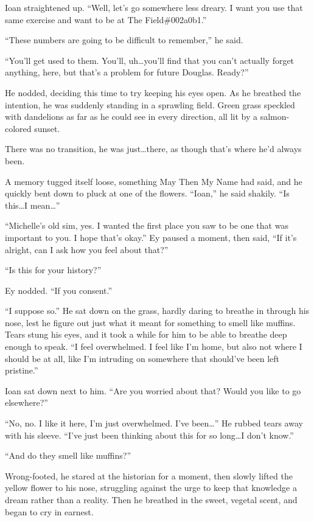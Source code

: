 Ioan straightened up. ``Well, let's go somewhere less dreary. I want you use that same exercise and want to be at The Field\#002a0b1.''

``These numbers are going to be difficult to remember,'' he said.

``You'll get used to them. You'll, uh\ldots you'll find that you can't actually forget anything, here, but that's a problem for future Douglas. Ready?''

He nodded, deciding this time to try keeping his eyes open. As he breathed the intention, he was suddenly standing in a sprawling field. Green grass speckled with dandelions as far as he could see in every direction, all lit by a salmon-colored sunset.

There was no transition, he was just\ldots there, as though that's where he'd always been.

A memory tugged itself loose, something May Then My Name had said, and he quickly bent down to pluck at one of the flowers. ``Ioan,'' he said shakily. ``Is this\ldots I mean\ldots{}''

``Michelle's old sim, yes. I wanted the first place you saw to be one that was important to you. I hope that's okay.'' Ey paused a moment, then said, ``If it's alright, can I ask how you feel about that?''

``Is this for your history?''

Ey nodded. ``If you consent.''

``I suppose so.'' He sat down on the grass, hardly daring to breathe in through his nose, lest he figure out just what it meant for something to smell like muffins. Tears stung his eyes, and it took a while for him to be able to breathe deep enough to speak. ``I feel overwhelmed. I feel like I'm home, but also not where I should be at all, like I'm intruding on somewhere that should've been left pristine.''

Ioan sat down next to him. ``Are you worried about that? Would you like to go elsewhere?''

``No, no. I like it here, I'm just overwhelmed. I've been\ldots{}'' He rubbed tears away with his sleeve. ``I've just been thinking about this for so long\ldots I don't know.''

``And do they smell like muffins?''

Wrong-footed, he stared at the historian for a moment, then slowly lifted the yellow flower to his nose, struggling against the urge to keep that knowledge a dream rather than a reality. Then he breathed in the sweet, vegetal scent, and began to cry in earnest.


